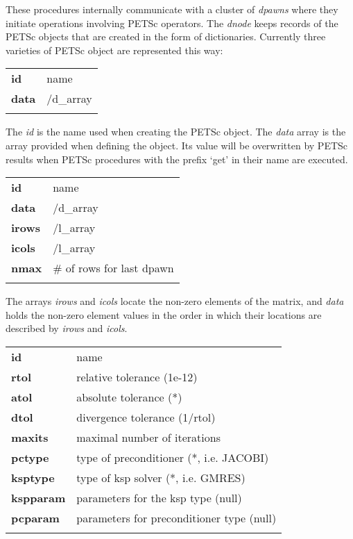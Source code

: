 These procedures internally communicate with a cluster of \emph{dpawns} where they initiate operations involving PETSc operators. The \emph{dnode} keeps records of the PETSc objects that are created in the form of dictionaries. Currently three varieties of PETSc object are represented this way:\\

\begin{supertabular}{>{\sffamily\bfseries}l>{\sffamily}l}
id & name\\
data & /d\_array\\\\
\end{supertabular}

The \emph{id} is the name used when creating the PETSc object. The \emph{data} array is the array provided when defining the object. Its value will be overwritten by PETSc results when PETSc procedures with the prefix `get' in their name are executed. 

\begin{supertabular}{>{\sffamily\bfseries}l>{\sffamily}l}
id & name\\
data & /d\_array\\
irows & /l\_array\\
icols & /l\_array\\
nmax & \# of rows for last dpawn\\\\
\end{supertabular}

The arrays \emph{irows} and \emph{icols} locate the non-zero elements of the matrix, and \emph{data} holds the non-zero element values in the order in which their locations are described by \emph{irows} and \emph{icols}.  

\begin{supertabular}{>{\sffamily\bfseries}l>{\sffamily}l}
id & name\\
rtol & relative tolerance (1e-12)\\
atol & absolute tolerance (*)\\
dtol & divergence tolerance (1/rtol)\\
maxits & maximal number of iterations\\
pctype & type of preconditioner (*, i.e. JACOBI)\\
ksptype & type of ksp solver (*, i.e. GMRES)\\
kspparam & parameters for the ksp type (null)\\
pcparam & parameters for preconditioner type (null)\\\\
\end{supertabular}


